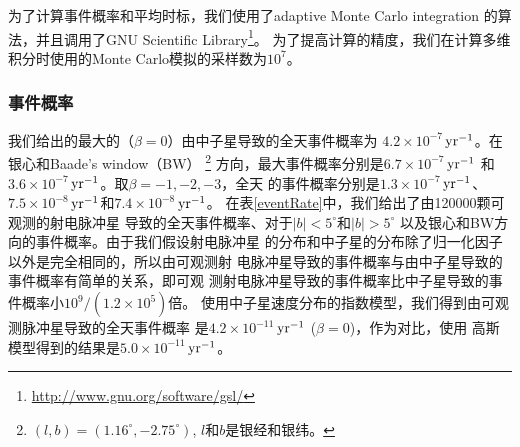 为了计算事件概率和平均时标，我们使用了adaptive Monte Carlo integration
的算法，并且调用了GNU Scientific Library\footnote{\url{http://www.gnu.org/software/gsl/}}。
为了提高计算的精度，我们在计算多维积分时使用的Monte Carlo模拟的采样数为$10^7$。

\subsubsection{事件概率}

我们给出的最大的（$\beta = 0$）由中子星导致的全天事件概率为
$4.2\times10^{-7}$\,$\rm{yr^{-1}}$。在银心和Baade's window（BW）
\footnote{$(l,b)=(1.16^{\circ},-2.75^{\circ})$, $l$和$b$是银经和银纬。} 
方向，最大事件概率分别是$6.7\times10^{-7}$\,$\rm{yr^{-1}}$
和$3.6\times10^{-7}$\,$\rm{yr^{-1}}$。取$\beta=-1,-2,-3$，全天
的事件概率分别是$1.3\times10^{-7}$\,$\rm{yr^{-1}}$、
$7.5\times10^{-8}$\,$\rm{yr^{-1}}$和$7.4\times10^{-8}$\,$\rm{yr^{-1}}$。
在表\ref{eventRate}中，我们给出了由120000颗可观测的射电脉冲星
导致的全天事件概率、对于$\mid b\mid<5^{\circ}$和$\mid
b\mid>5^{\circ}$ 以及银心和BW方向的事件概率。由于我们假设射电脉冲星
的分布和中子星的分布除了归一化因子以外是完全相同的，所以由可观测射
电脉冲星导致的事件概率与由中子星导致的事件概率有简单的关系，即可观
测射电脉冲星导致的事件概率比中子星导致的事件概率小$10^9/\left(1.2\times10^5\right)$倍。
使用中子星速度分布的指数模型，我们得到由可观测脉冲星导致的全天事件概率
是$4.2\times10^{-11}$\,$\rm{yr^{-1}}$ ($\beta=0$)，作为对比，使用
高斯模型得到的结果是$5.0\times10^{-11}$\,$\rm{yr^{-1}}$。

